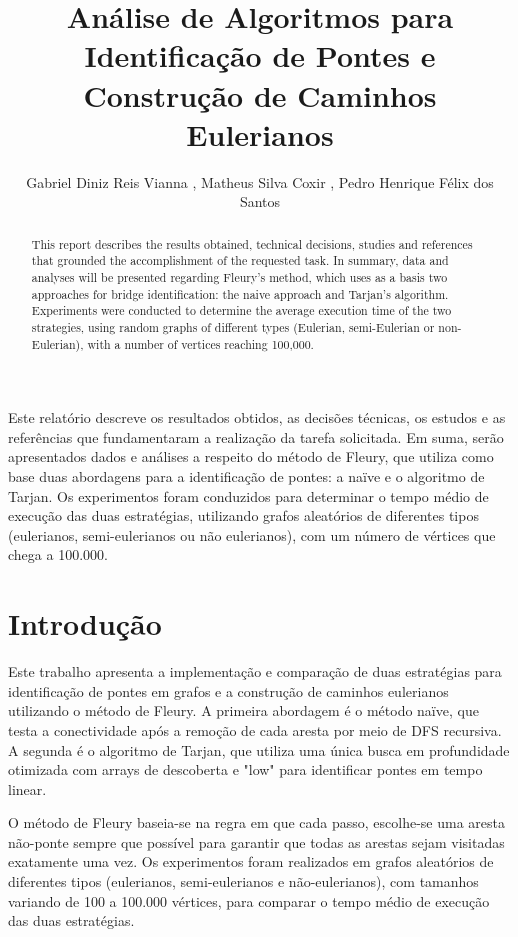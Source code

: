 \documentclass[12pt]{article}
\title{Análise de Algoritmos para Identificação de Pontes e Construção de Caminhos Eulerianos}
\author{Gabriel Diniz Reis Vianna \inst{1}, Matheus Silva Coxir \inst{1}, Pedro Henrique Félix dos Santos \inst{1} }
\begin{document}
 

\maketitle

\begin{abstract}
This report describes the results obtained, technical decisions, studies and references that grounded the accomplishment of the requested task. In summary, data and analyses will be presented regarding Fleury's method, which uses as a basis two approaches for bridge identification: the naive approach and Tarjan's algorithm. Experiments were conducted to determine the average execution time of the two strategies, using random graphs of different types (Eulerian, semi-Eulerian or non-Eulerian), with a number of vertices reaching 100,000.
\end{abstract}
     
\begin{resumo} 
Este relatório descreve os resultados obtidos, as decisões técnicas, os estudos e as referências que fundamentaram a realização da tarefa solicitada. Em suma, serão apresentados dados e análises a respeito do método de Fleury, que utiliza como base duas abordagens para a identificação de pontes: a naïve e o algoritmo de Tarjan. Os experimentos foram conduzidos para determinar o tempo médio de execução das duas estratégias, utilizando grafos aleatórios de diferentes tipos (eulerianos, semi-eulerianos ou não eulerianos), com um número de vértices que chega a 100.000.
\end{resumo}

\section{Introdução}

Este trabalho apresenta a implementação e comparação de duas estratégias para identificação de pontes em grafos e a construção de caminhos eulerianos utilizando o método de Fleury. A primeira abordagem é o método naïve, que testa a conectividade após a remoção de cada aresta por meio de DFS recursiva. A segunda é o algoritmo de Tarjan, que utiliza uma única busca em profundidade otimizada com arrays de descoberta e "low" para identificar pontes em tempo linear.

O método de Fleury baseia-se na regra em que cada passo, escolhe-se uma aresta não-ponte sempre que possível para garantir que todas as arestas sejam visitadas exatamente uma vez. Os experimentos foram realizados em grafos aleatórios de diferentes tipos (eulerianos, semi-eulerianos e não-eulerianos), com tamanhos variando de 100 a 100.000 vértices, para comparar o tempo médio de execução das duas estratégias.
\end{document}
